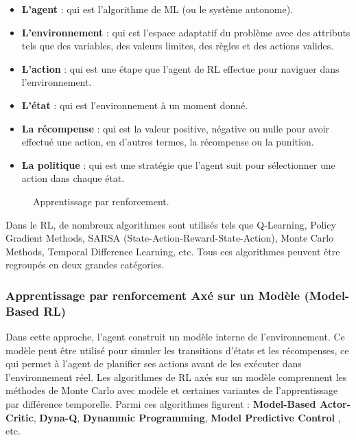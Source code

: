 \begin{itemize}
	\item[\ding{118}] \textbf{L'agent} : qui est l'algorithme de ML (ou le système autonome).
	\item[\ding{118}] \textbf{L'environnement} : qui est l'espace adaptatif du problème avec des attributs tels que des variables, des valeurs limites, des règles et des actions valides.
	\item[\ding{118}] \textbf{L'action} : qui est une étape que l'agent de RL effectue pour naviguer dans l'environnement.
	\item[\ding{118}] \textbf{L'état} : qui est l'environnement à un moment donné.
	\item[\ding{118}] \textbf{La récompense} : qui est la valeur positive, négative ou nulle pour avoir effectué une action, en d'autres termes, la récompense ou la punition.
	\item[\ding{118}] \textbf{La politique} : qui est une stratégie que l'agent suit pour sélectionner une action dans chaque état.
	
\end{itemize}
\begin{figure}[H]%
    \center%
    \setlength{\fboxsep}{5pt}%
    \setlength{\fboxrule}{0.5pt}%
    \caption{Apprentissage par renforcement.}%
\end{figure}
Dans le RL, de nombreux algorithmes sont utilisés tels que Q-Learning, Policy Gradient Methods, SARSA (State-Action-Reward-State-Action), Monte Carlo Methods, Temporal Difference Learning, etc. Tous ces algorithmes peuvent être regroupés en deux grandes catégories.
 
\subsubsection{Apprentissage par renforcement Axé sur un Modèle (Model-Based RL)}
Dans cette approche, l’agent construit un modèle interne de l’environnement. Ce modèle
peut être utilisé pour simuler les transitions d’états et les récompenses, ce qui permet à l’agent de
planifier ses actions avant de les exécuter dans l’environnement réel. Les algorithmes de RL axés
sur un modèle comprennent les méthodes de Monte Carlo avec modèle et certaines variantes
de l’apprentissage par différence temporelle. Parmi ces algorithmes figurent : \textbf{Model-Based
Actor-Critic}, \textbf{Dyna-Q}, \textbf{Dynammic Programming}, \textbf{Model Predictive Control} , etc.

